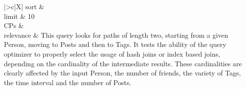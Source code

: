 \begin{tabularx}{\queryCardWidth}{|>{\queryPropertyCell}c|X|}
%
	sort		&
		\innerCardVSpace \\ \hline
	limit & 10 \\ \hline
	CPs &
	 \\ \hline
	relevance &
		\small This query looks for paths of length two, starting from a given Person, moving to Posts and then to Tags. It tests
the ability of the query optimizer to properly select the usage of hash joins or index based joins, depending on the
cardinality of the intermediate results. These cardinalities are clearly affected by the input Person, the number of
friends, the variety of Tags, the time interval and the number of Posts.
 \\ \hline%
\end{tabularx}
\queryCardVSpace